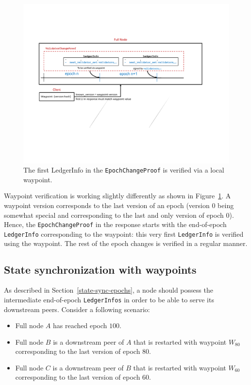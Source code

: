 \documentclass[letterpaper,10pt]{article}
\begin{document}
\begin{figure}[ht]
	\centering
	\includegraphics[width=\textwidth]{figures/waypoint-verification.pdf}
	\caption{\footnotesize{The first LedgerInfo in the \texttt{EpochChangeProof} is verified via a local waypoint.}}
	\label{fig:waypoint-verification}
\end{figure}

Waypoint verification is working slightly differently as shown in Figure~\ref{fig:waypoint-verification}.
A waypoint version corresponds to the last version of an epoch (version $0$ being somewhat special and corresponding to the last and only version of epoch $0$).
Hence, the \texttt{EpochChangeProof} in the response starts with the end-of-epoch \texttt{LedgerInfo} corresponding to the waypoint: this very first \texttt{LedgerInfo} is verified using the waypoint. The rest of the epoch changes is verified in a regular manner.

\subsection{State synchronization with waypoints}
\label{waypoint-state-sync}
As described in Section~\ref{state-sync-epochs}, a node should possess the intermediate end-of-epoch \texttt{LedgerInfos} in order to be able to serve its downstream peers.
Consider a following scenario:
\begin{itemize}
\item Full node $A$ has reached epoch $100$.
\item Full node $B$ is a downstream peer of $A$ that is restarted with waypoint $W_{80}$ corresponding to the last version of epoch $80$.
\item Full node $C$ is a downstream peer of $B$ that is restarted with waypoint $W_{60}$ corresponding to the last version of epoch $60$.
\end{itemize}
\end{document}
